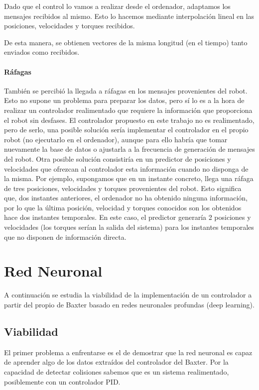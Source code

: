 Dado que el control lo vamos a realizar desde el ordenador, adaptamos los mensajes recibidos al mismo. Esto lo hacemos mediante interpolación lineal en las posiciones, velocidades y torques recibidos.

De esta manera, se obtienen vectores de la misma longitud (en el tiempo) tanto enviados como recibidos.

\paragraph{Ráfagas}
También se percibió la llegada a ráfagas en los mensajes provenientes del robot. Esto no supone un problema para preparar los datos, pero sí lo es a la hora de realizar un controlador realimentado que requiere la información que proporciona el robot sin desfases. El controlador propuesto en este trabajo no es realimentado, pero de serlo, una posible solución sería implementar el controlador en el propio robot (no ejecutarlo en el ordenador), aunque para ello habría que tomar nuevamente la base de datos o ajustarla a la frecuencia de generación de mensajes del robot. Otra posible solución consistiría en un predictor de posiciones y velocidades que ofrezcan al controlador esta información cuando no disponga de la misma. Por ejemplo, supongamos que en un instante concreto, llega una ráfaga de tres posiciones, velocidades y torques provenientes del robot. Esto significa que, dos instantes anteriores, el ordenador no ha obtenido ninguna información, por lo que la última posición, velocidad y torques conocidos son los obtenidos hace dos instantes temporales. En este caso, el predictor generaría 2 posiciones y velocidades (los torques serían la salida del sistema) para los instantes temporales que no disponen de información directa.


\section{Red Neuronal}
A continuación se estudia la viabilidad de la implementación de un controlador a partir del propio de Baxter basado en redes neuronales profundas (deep learning).
\subsection{Viabilidad}
El primer problema a enfrentarse es el de demostrar que la red neuronal es capaz de aprender algo de los datos extraídos del controlador del Baxter. Por la capacidad de detectar colisiones sabemos que es un sistema realimentado, posiblemente con un controlador PID.


